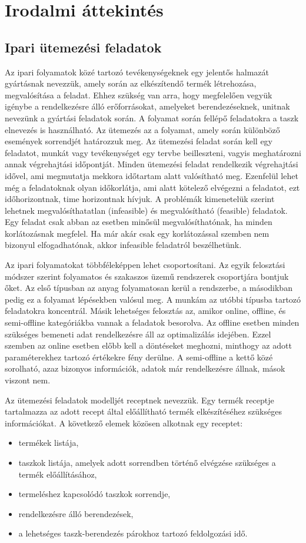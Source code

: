\chapter{Irodalmi áttekintés}
\section{Ipari ütemezési feladatok}
Az ipari folyamatok közé tartozó tevékenységeknek egy jelentős halmazát gyártásnak nevezzük, amely során az elkészítendő termék létrehozása, megvalósítása a feladat.
Ehhez szükség van arra, hogy megfelelően vegyük igénybe a rendelkezésre álló erőforrásokat, amelyeket berendezéseknek, unitnak nevezünk a gyártási feladatok során.
A folyamat során fellépő feladatokra a taszk elnevezés is használható.
Az ütemezés az a folyamat, amely során különböző események sorrendjét határozzuk meg.
Az ütemezési feladat során kell egy feladatot, munkát vagy tevékenységet egy tervbe beilleszteni, vagyis meghatározni annak végrehajtási időpontját.
Minden ütemezési feladat rendelkezik végrehajtási idővel, ami megmutatja mekkora időtartam alatt valósítható meg.
Ezenfelül lehet még a feladatoknak olyan időkorlátja, ami alatt kötelező elvégezni a feladatot, ezt időhorizontnak, time horizontnak hívjuk.
A problémák kimenetelük szerint lehetnek megvalósíthatatlan (infeasible) és megvalósítható (feasible) feladatok.
Egy feladat csak abban az esetben minősül megvalósíthatónak, ha minden korlátozásnak megfelel.
Ha már akár csak egy korlátozással szemben nem bizonyul elfogadhatónak, akkor infeasible feladatról beszélhetünk.

Az ipari folyamatokat többféleképpen lehet csoportosítani.
Az egyik felosztási módszer szerint folyamatos és szakaszos üzemű rendszerek csoportjára bontjuk őket.
Az első típusban az anyag folyamatosan kerül a rendszerbe, a másodikban pedig ez a folyamat lépésekben valósul meg.
A munkám az utóbbi típusba tartozó feladatokra koncentrál.
Másik lehetséges felosztás az, amikor online, offline, és semi-offline kategóriákba vannak a feladatok besorolva.
Az offline esetben minden szükséges bemeneti adat rendelkezésre áll az optimalizálás idejében.
Ezzel szemben az online esetben előbb kell a döntéseket meghozni, minthogy az adott paraméterekhez tartozó értékekre fény derülne.
A semi-offline a kettő közé sorolható, azaz bizonyos információk, adatok már rendelkezésre állnak, mások viszont nem.

Az ütemezési feladatok modelljét receptnek nevezzük.
Egy termék receptje tartalmazza az adott recept által előállítható termék elkészítéséhez szükséges információkat\cite{Hegyhati}.
A következő elemek közösen alkotnak egy receptet:
\begin{itemize}
  \item termékek listája,
  \item taszkok listája, amelyek adott sorrendben történő elvégzése szükséges a termék előállításához,
  \item termeléshez kapcsolódó taszkok sorrendje,
  \item rendelkezésre álló berendezések,
  \item a lehetséges taszk-berendezés párokhoz tartozó feldolgozási idő.
\end{itemize}


